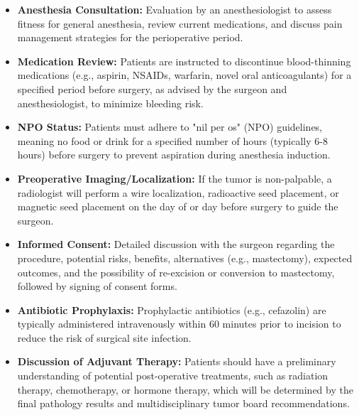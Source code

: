 \begin{itemize}
  \item \textbf{Anesthesia Consultation:} Evaluation by an anesthesiologist to assess fitness for general anesthesia, review current medications, and discuss pain management strategies for the perioperative period.
  
  \item \textbf{Medication Review:} Patients are instructed to discontinue blood-thinning medications (e.g., aspirin, NSAIDs, warfarin, novel oral anticoagulants) for a specified period before surgery, as advised by the surgeon and anesthesiologist, to minimize bleeding risk.
  
  \item \textbf{NPO Status:} Patients must adhere to "nil per os" (NPO) guidelines, meaning no food or drink for a specified number of hours (typically 6-8 hours) before surgery to prevent aspiration during anesthesia induction.
  
  \item \textbf{Preoperative Imaging/Localization:} If the tumor is non-palpable, a radiologist will perform a wire localization, radioactive seed placement, or magnetic seed placement on the day of or day before surgery to guide the surgeon.
  
  \item \textbf{Informed Consent:} Detailed discussion with the surgeon regarding the procedure, potential risks, benefits, alternatives (e.g., mastectomy), expected outcomes, and the possibility of re-excision or conversion to mastectomy, followed by signing of consent forms.
  
  \item \textbf{Antibiotic Prophylaxis:} Prophylactic antibiotics (e.g., cefazolin) are typically administered intravenously within 60 minutes prior to incision to reduce the risk of surgical site infection.
  
  \item \textbf{Discussion of Adjuvant Therapy:} Patients should have a preliminary understanding of potential post-operative treatments, such as radiation therapy, chemotherapy, or hormone therapy, which will be determined by the final pathology results and multidisciplinary tumor board recommendations.
\end{itemize}

